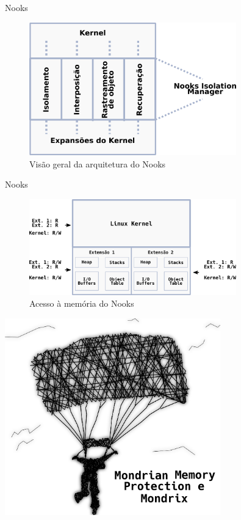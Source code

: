 \documentclass[xcolor={usenames,svgnames,dvipsnames},brazil,english,12pt,aspectratio=149]{beamer}
\begin{document}
\begin{frame}{Nooks}
  \begin{figure}[!h]
    \centering
    \includegraphics[width=0.8\textwidth]{nooks_nim}
    \caption*{Visão geral da arquitetura do Nooks}
  \end{figure}
\end{frame}

\begin{frame}{Nooks}
  \begin{figure}[!h]
    \centering
    \includegraphics[width=0.8\textwidth]{nooks_mem}
    \caption*{Acesso à memória do Nooks}
  \end{figure}
\end{frame}

\begin{frame}[plain]
  \includegraphics[width=0.7\textwidth]{presentation_cap2_six}
\end{frame}
\end{document}
